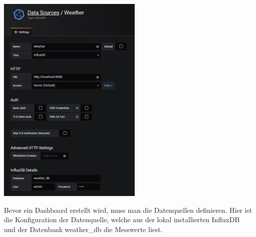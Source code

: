 \documentclass[
  12pt, %
  a4paper, %
  twoside, %
  openany, %
  numbers=noenddot, %
  BCOR=5mm, %
  parskip=half*, %
  thesis, %
]{bfhbook}
\begin{document}
\begin{center}
    \begin{minipage}[t]{0.45\textwidth}
        \centering
        \includegraphics[width=7cm, valign=t]{Bilder/Grafana-Datasource.PNG} %
        \captionsetup{justification=centering}
    \end{minipage}
    \begin{minipage}[t]{0.45\textwidth}
Bevor ein Dashboard erstellt wird, muss man die Datenquellen definieren. Hier ist die Konfiguration der Datenquelle, welche aus der lokal installierten InfluxDB und der Datenbank weather{\_}db die Messwerte liest.
    \end{minipage}
\end{center}
\end{document}
